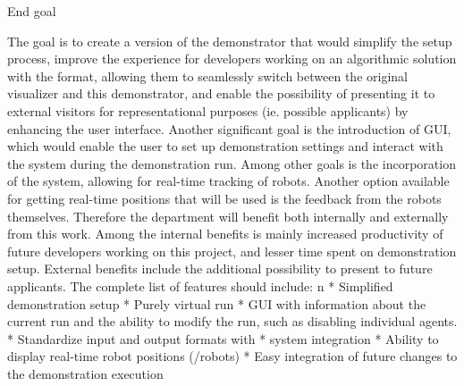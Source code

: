 \sec End goal

The goal is to create a version of the demonstrator that would simplify the setup process, improve the experience for developers working on an algorithmic solution with the {\mapfIR} format, allowing them to seamlessly switch between the original visualizer and this demonstrator, and enable the possibility of presenting it to external visitors for representational purposes (ie. possible applicants) by enhancing the user interface.\br
Another significant goal is the introduction of GUI, which would enable the user to set up demonstration settings and interact with the system during the demonstration run.
Among other goals is the incorporation of the {\vicon} system, allowing for real-time tracking of robots. Another option available for getting real-time positions that will be used is the feedback from the robots themselves.\br
\br
Therefore the department will benefit both internally and externally from this work. Among the internal benefits is mainly increased productivity of future developers working on this project, and lesser time spent on demonstration setup. External benefits include the additional possibility to present to future applicants.
The complete list of features should include:
\begitems \style n
    * Simplified demonstration setup
    * Purely virtual run
    * GUI with information about the current run and the ability to modify the run, such as disabling individual agents. 
    * Standardize input and output formats with \mapfIR
    * {\vicon} system integration
    * Ability to display real-time robot positions ({\vicon}/robots)
    * Easy integration of future changes to the demonstration execution
\enditems